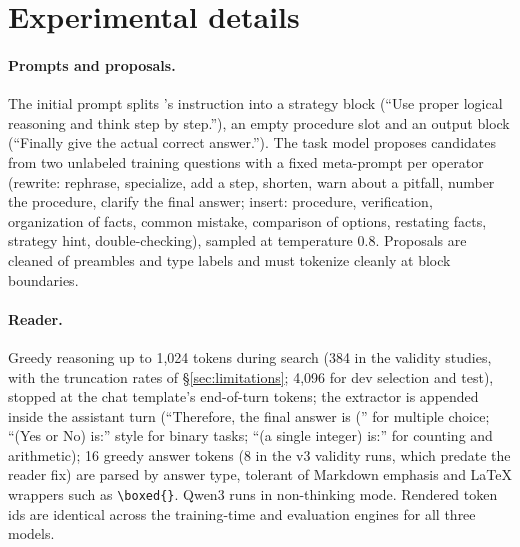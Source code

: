 \section{Experimental details}
\label{app:details}

\paragraph{Prompts and proposals.} The initial prompt splits \greater{}'s instruction into
a strategy block (``Use proper logical reasoning and think step by step.''), an empty
procedure slot and an output block (``Finally give the actual correct answer.''). The
task model proposes candidates from two unlabeled training questions with a fixed
meta-prompt per operator (rewrite: rephrase, specialize, add a step, shorten, warn about a
pitfall, number the procedure, clarify the final answer; insert: procedure, verification,
organization of facts, common mistake, comparison of options, restating facts, strategy
hint, double-checking), sampled at temperature 0.8. Proposals are cleaned of preambles and
type labels and must tokenize cleanly at block boundaries.

\paragraph{Reader.} Greedy reasoning up to 1{,}024 tokens during search (384 in the validity
studies, with the truncation rates of \S\ref{sec:limitations}; 4{,}096 for dev selection and test),
stopped at the chat template's end-of-turn tokens; the extractor
is appended inside the assistant turn (``Therefore, the final answer is ('' for
multiple choice; ``(Yes or No) is:'' style for binary tasks; ``(a single integer) is:''
for counting and arithmetic); 16 greedy answer tokens (8 in the v3 validity runs, which predate the
reader fix) are parsed by answer type, tolerant
of Markdown emphasis and \LaTeX{} wrappers such as \verb|\boxed{}|. Qwen3 runs in
non-thinking mode. Rendered token ids are identical across the training-time and
evaluation engines for all three models.

